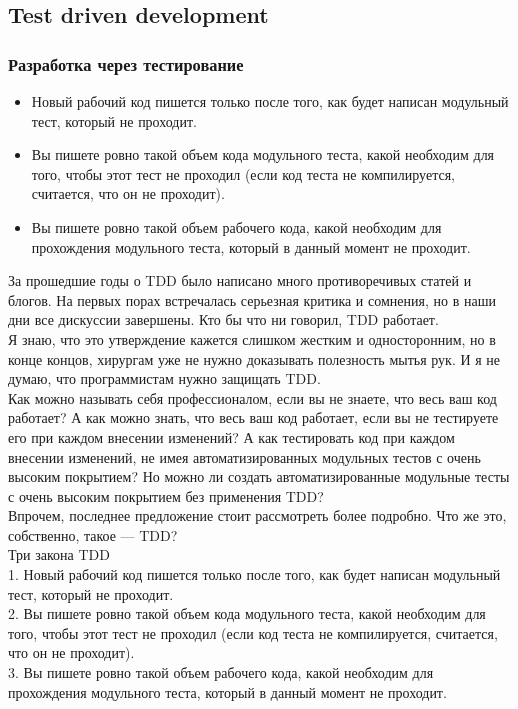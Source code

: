 \documentclass{../industrial-development}
\begin{document}
\subsection{Test driven development}
\begin{frame} \frametitle{Разработка через тестирование}
\begin{itemize}
  \item Новый рабочий код пишется только после того, как будет написан модульный тест, который не проходит.
  \item Вы пишете ровно такой объем кода модульного теста, какой необходим для того, чтобы этот тест не проходил (если код теста не компилируется, считается, что он не проходит).
	\item Вы пишете ровно такой объем рабочего кода, какой необходим для прохождения модульного теста, который в данный момент не проходит.
\end{itemize}
\end{frame}
\lecturenotes
За прошедшие годы о TDD было написано много противоречивых статей и блогов. На первых порах встречалась серьезная критика и сомнения, но в наши дни все дискуссии завершены. Кто бы что ни говорил, TDD работает.\\
Я знаю, что это утверждение кажется слишком жестким и односторонним, но в конце концов, хирургам уже не нужно доказывать полезность мытья рук. И я не думаю, что программистам нужно защищать TDD.\\
Как можно называть себя профессионалом, если вы не знаете, что весь ваш код работает? А как можно знать, что весь ваш код работает, если вы не тестируете его при каждом внесении изменений? А как тестировать код при каждом внесении изменений, не имея автоматизированных модульных тестов с очень высоким покрытием? Но можно ли создать автоматизированные модульные тесты с очень высоким покрытием без применения TDD?\\
Впрочем, последнее предложение стоит рассмотреть более подробно. Что же это, собственно, такое — TDD?\\
Три закона TDD\\
1. Новый рабочий код пишется только после того, как будет написан модульный тест, который не проходит.\\
2. Вы пишете ровно такой объем кода модульного теста, какой необходим для того, чтобы этот тест не проходил (если код теста не компилируется, считается, что он не проходит).\\
3. Вы пишете ровно такой объем рабочего кода, какой необходим для прохождения модульного теста, который в данный момент не проходит.\\
\end{document}
